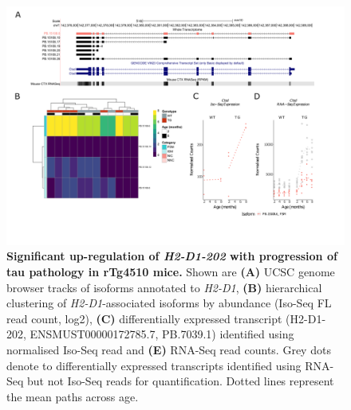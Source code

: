 \begin{landscape}
	\begin{figure}[!htp]
		\centering
		\includegraphics[page=2,trim={1.5cm 3.5cm 2cm 1cm}, scale = 0.85]{Figures/Ch5_DiffPlots_Landscape.pdf}
		\captionsetup{width=1.5\textwidth}
		\caption[Differential \textit{H2-D1} transcript expression]%
		{\textbf{Significant up-regulation of \textit{H2-D1-202} with progression of tau pathology in rTg4510 mice.} Shown are \textbf{(A)} UCSC genome browser tracks of isoforms annotated to \textit{H2-D1}, \textbf{(B)} hierarchical clustering of \textit{H2-D1}-associated isoforms by abundance (Iso-Seq FL read count, log2), \textbf{(C)} differentially expressed transcript (H2-D1-202, ENSMUST00000172785.7, PB.7039.1) identified using normalised Iso-Seq read and \textbf{(E)} RNA-Seq read counts. Grey dots denote to differentially expressed transcripts identified using RNA-Seq but not Iso-Seq reads for quantification. Dotted lines represent the mean paths across age.}   
		\label{fig:H2D1}
	\end{figure}	
\end{landscape}

